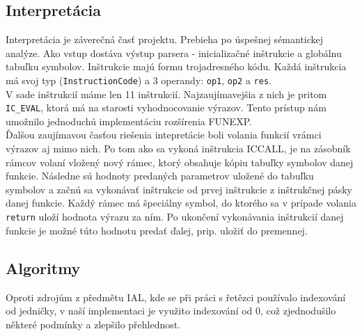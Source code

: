 \documentclass[12pt, a4paper]{article}
\begin{document}
        \subsection{Interpretácia}
		    Interpretácia je záverečná časť projektu. Prebieha po úspešnej sémantickej analýze. Ako vstup dostáva výstup parsera - inicializačné inštrukcie a globálnu tabuľku symbolov.
		    Inštrukcie majú formu trojadresného kódu. Každá inštrukcia má svoj typ (\verb|InstructionCode|) a 3 operandy: \verb|op1|, \verb|op2| a \verb|res|.\\
		    V sade inštrukcií máme len 11 inštrukcií. Najzaujímavejšia z nich je pritom \verb|IC_EVAL|, ktorá má na starosti vyhodnocovanie výrazov. Tento prístup nám umožnilo jednoduchú implementáciu rozšírenia FUNEXP.\\
		    Ďalšou zaujímavou časťou riešenia intepretácie boli volania funkcií vrámci výrazov aj mimo nich. Po tom ako sa vykoná inštrukcia IC\textunderscore{}CALL, je na zásobník rámcov volaní vložený nový rámec, ktorý obsahuje kópiu tabuľky symbolov danej funkcie. Následne sú hodnoty predaných parametrov uložené do tabuľku symbolov a začnú sa vykonávať inštrukcie od prvej inštrukcie z inštrukčnej pásky danej funkcie. Každý rámec má špeciálny symbol, do ktorého sa v prípade volania \verb|return| uloží hodnota výrazu za ním. Po ukončení vykonávania inštrukcií danej funkcie je možné túto hodnotu predať ďalej, prip. uložiť do premennej.

        \subsection{Algoritmy}
        Oproti zdrojům z předmětu IAL, kde se při práci s řetězci používalo indexování od jedničky, v naší implementaci je využito indexování od 0, což zjednodušilo některé podmínky a zlepšilo přehlednost.
\end{document}
